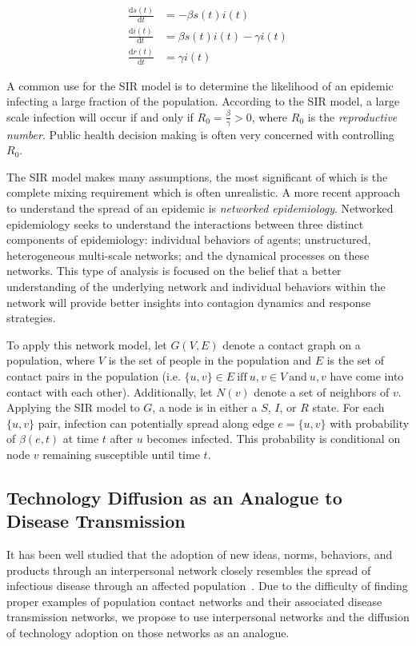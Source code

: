 \documentclass[12pt, oneside, openany]{article} %
\newcommand{\deriv}[2]{\frac{\mathrm d #1}{\mathrm d #2}}
\begin{document}
\begin{align}
	\deriv{s(t)}{t} &= -\beta s(t) i(t) \\
	\deriv{i(t)}{t} &= \beta s(t) i(t) - \gamma i(t) \\
	\deriv{r(t)}{t} &= \gamma i(t)
\end{align}

A common use for the SIR model is to determine the likelihood of an epidemic infecting a large fraction of the population. According to the SIR model, a large scale infection will occur if and only if $R_{0} = \frac{\beta}{\gamma} > 0 $, where $R_{0}$ is the \textit{reproductive number}. Public health decision making is often very concerned with controlling $R_{0}$.

The SIR model makes many assumptions, the most significant of which is the complete mixing requirement which is often unrealistic. A more recent approach to understand the spread of an epidemic is \textit{networked epidemiology}. Networked epidemiology seeks to understand the interactions between three distinct components of epidemiology: individual behaviors of agents; unstructured, heterogeneous multi-scale networks; and the dynamical processes on these networks. This type of analysis is focused on the belief that a better understanding of the underlying network and individual behaviors within the network will provide better insights into contagion dynamics and response strategies. 

To apply this network model, let $G(V, E)$ denote a contact graph on a population, where $V$ is the set of people in the population and $E$ is the set of contact pairs in the population (i.e. $\{u,v\}\in E~ \mathrm{iff}~u,v\in V~\mathrm{and}~u,v$ have come into contact with each other). Additionally, let $N(v)$ denote a set of neighbors of $v$. Applying the SIR model to $G$, a node is in either a $S$, $I$, or $R$ state. For each $\{u,v\}$ pair, infection can potentially spread along edge $e = \{u, v\}$ with probability of $ \beta(e,t) $ at time $t$ after $u$ becomes infected. This probability is conditional on node $v$ remaining susceptible until time $t$.~\cite{marathe} 

\subsection{Technology Diffusion as an Analogue to Disease Transmission}
It has been well studied that the adoption of new ideas, norms, behaviors, and products through an interpersonal network closely resembles the spread of infectious disease through an affected population~\cite{goel}. Due to the difficulty of finding proper examples of population contact networks and their associated disease transmission networks, we propose to use interpersonal networks and the diffusion of technology adoption on those networks as an analogue.
\end{document}
